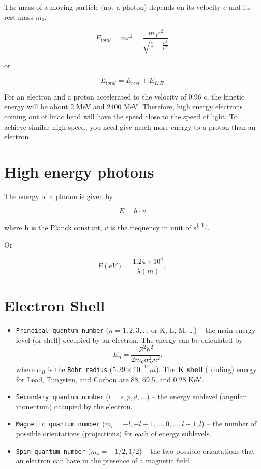 \documentclass[]{book}
\providecommand{\tightlist}{%
  \setlength{\itemsep}{0pt}\setlength{\parskip}{0pt}}
\theoremstyle{definition}
\theoremstyle{definition}
\theoremstyle{definition}
\theoremstyle{remark}
\begin{document}
The mass of a moving particle (not a photon) depends on its velocity
\(\upsilon\) and its rest mass \(m_0\).

\begin{equation}
    E_{total} = mc^2 = \frac{m_0c^2}{\sqrt{1-\frac{\upsilon^2}{c^2}}} 
    \label{eq:emc2}
\end{equation}

or

\begin{equation}
    E_{total} = E_{rest}+E_{K.E} 
\end{equation}

For an electron and a proton accelerated to the velocity of 0.96 c, the
kinetic energy will be about 2 MeV and 2400 MeV. Therefore, high energy
electrons coming out of linac head will have the speed close to the
speed of light. To achieve similar high speed, you need give much more
energy to a proton than an electron.

\section{High energy photons}\label{high-energy-photons}

The energy of a photon is given by

\begin{equation}
    E = h\cdot v
    \label{eq:frequency}
\end{equation}

where h is the Planck constant, \(v\) is the frequency in unit of
s\textsuperscript{\{-1\}}.

Or

\begin{equation}
    E (eV) = \frac{1.24\times 10^{6}}{\lambda (m)}, 
    \label{eq:wavelength}
\end{equation}

\section{Electron Shell}\label{electron-shell}

\begin{itemize}
\tightlist
\item
  \texttt{Principal\ quantum\ number} (\(n = 1, 2, 3, ...\) or K, L, M,
  \ldots{}) -- the main energy level (or shell) occupied by an electron.
  The energy can be calculated
  by\[E_n=\frac{Z^2{\hbar}^2}{2m_0\alpha^2_Bn^2},\] where \(\alpha_B\)
  is the \texttt{Bohr\ radius} (\(5.29 \times 10^{-11}m\)). The
  \textbf{K shell} (binding) energy for Lead, Tungsten, and Carbon are
  88, 69.5, and 0.28 KeV.
\item
  \texttt{Secondary\ quantum\ number} (\(l = s, p, d, ...\)) -- the
  energy sublevel (angular monentum) occupied by the electron.
\item
  \texttt{Magnetic\ quantum\ number}
  (\(m_l = -l, -l+1, ..., 0, ..., l-1, l\)) -- the number of possible
  orientations (projections) for each of energy sublevels.
\item
  \texttt{Spin\ quantum\ number} (\(m_s=-1/2, 1/2\)) -- the two possible
  orientations that an electron can have in the presence of a magnetic
  field.
\end{itemize}
\end{document}
